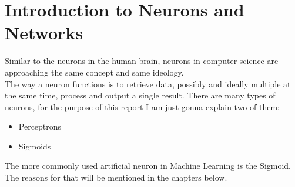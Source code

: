 
\section{Introduction to Neurons and Networks}
Similar to the neurons in the human brain, neurons in computer science are approaching the same concept and same ideology.\\
The way a neuron functions is to retrieve data, possibly and ideally multiple at the same time, process and output a single result. There
are many types of neurons, for the purpose of this report I am just gonna explain two of them:
\begin{itemize}
    \item Perceptrons
    \item Sigmoids
\end{itemize}
The more commonly used artificial neuron in Machine Learning is the Sigmoid. The reasons for that will be mentioned in the chapters
below.

